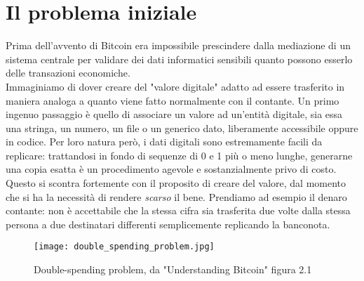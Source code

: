 \section{Il problema iniziale}
	Prima dell'avvento di Bitcoin era impossibile prescindere dalla mediazione di un sistema centrale per validare dei dati informatici sensibili quanto possono esserlo delle transazioni economiche. \\
	Immaginiamo di dover creare del "valore digitale" adatto ad essere trasferito in maniera analoga a quanto viene fatto normalmente con il contante. Un primo ingenuo passaggio è quello di associare un valore ad un'entità digitale, sia essa una stringa, un numero, un file o un generico dato, liberamente accessibile oppure in codice. Per loro natura però, i dati digitali sono estremamente facili da replicare: trattandosi in fondo di sequenze di 0 e 1 più o meno lunghe, generarne una copia esatta è un procedimento agevole e sostanzialmente privo di costo. Questo si scontra fortemente con il proposito di creare del valore, dal momento che si ha la necessità di rendere \emph{scarso} il bene. Prendiamo ad esempio il denaro contante: non è accettabile che la stessa cifra sia trasferita due volte dalla stessa persona a due destinatari differenti semplicemente replicando la banconota.
	\begin{figure}[ht]
		\centering
		\texttt{[image: double\_spending\_problem.jpg]}
		\caption{Double-spending problem, da "Understanding Bitcoin" \cite{understanding_bitcoin} figura 2.1}
		\label{fig:double-spending_img}
	\end{figure}

